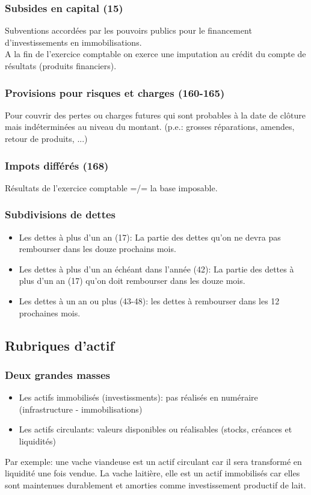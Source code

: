 \documentclass{article}
\begin{document}
\subsubsection*{Subsides en capital (15)}
Subventions accordées par les pouvoirs publics pour le financement d'investissements en immobilisations.\\
A la fin de l'exercice comptable on exerce une imputation au crédit du compte de résultats (produits financiers).

\subsubsection*{Provisions pour risques et charges (160-165)}
Pour couvrir des pertes ou charges futures qui sont probables à la date de clôture mais indéterminées au niveau du montant. (p.e.: grosses réparations, amendes, retour de produits, ...)\\

\subsubsection*{Impots différés (168)}
Résultats de l'exercice comptable =/= la base imposable.

\subsubsection*{Subdivisions de dettes}
\begin{itemize}
    \item Les dettes à plus d'un an (17): La partie des dettes qu'on ne devra pas rembourser dans les douze prochains mois.
    \item Les dettes à plus d'un an échéant dans l'année (42): La partie des dettes à plus d'un an (17) qu'on doit rembourser dans les douze mois.
    \item Les dettes à un an ou plus (43-48): les dettes à rembourser dans les 12 prochaines mois.
\end{itemize}
\subsection{Rubriques d'actif}
\subsubsection*{Deux grandes masses}
\begin{itemize}
    \item Les actifs immobilisés (investissments): pas réalisés en numéraire (infrastructure - immobilisations)
    \item Les actifs circulants: valeurs disponibles ou réalisables (stocks, créances et liquidités)
\end{itemize}
Par exemple: une vache viandeuse est un actif circulant car il sera transformé en liquidité une fois vendue. La vache laitière, elle est un actif immobilisés car elles sont maintenues durablement et amorties comme investissement productif de lait.
\end{document}

